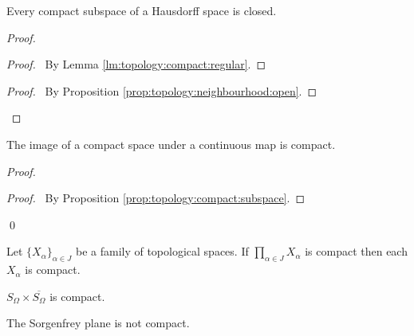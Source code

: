 \begin{prop}
  \label{prop:topology:compact:compact_is_closed}
  Every compact subspace of a Hausdorff space is closed.
\end{prop}

\begin{proof}
  \pf
  \begin{proof}
    \pf\ By Lemma \ref{lm:topology:compact:regular}.
  \end{proof}
  \qedstep
  \begin{proof}
    \pf\ By Proposition \ref{prop:topology:neighbourhood:open}.
  \end{proof}
\end{proof}


\begin{prop}
  \label{prop:topology:compact:image}
  The image of a compact space under a continuous map is compact.
\end{prop}

\begin{proof}
  \pf
  \qedstep
  \begin{proof}
    \pf\ By Proposition \ref{prop:topology:compact:subspace}.
  \end{proof}
  \qed
\end{proof}

\begin{cor}
  Let $\{ X_\alpha \}_{\alpha \in J}$ be a family of topological spaces. If
  $\prod_{\alpha \in J} X_\alpha$ is compact then each $X_\alpha$ is compact.
\end{cor}

\begin{cor}
  $S_\Omega \times \overline{S_\Omega}$ is compact.
\end{cor}

\begin{cor}
 The Sorgenfrey plane is not compact.
\end{cor}

